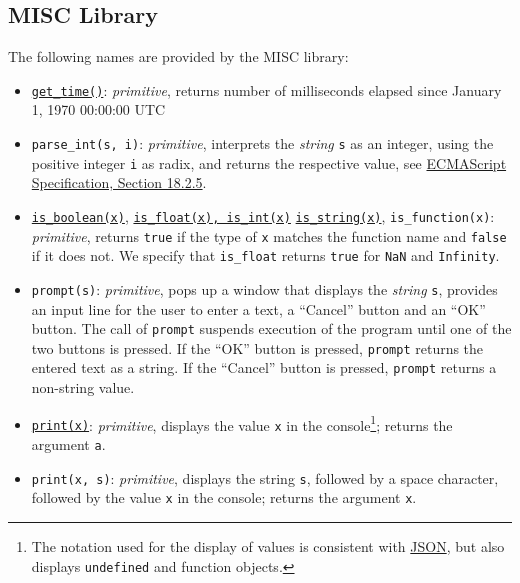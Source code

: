 \subsection*{MISC Library}


The following
names are provided by the MISC library:
\begin{itemize}
\item \href{https://sourceacademy.org/sicpjs/1.2.6\#ex_1.22}{\lstinline{get_time()}}: \textit{primitive}, returns number of milliseconds elapsed since January 1, 1970 00:00:00 UTC
\item \verb#parse_int#\texttt{(s, i)}: \textit{primitive}, 
interprets the \emph{string} \texttt{s} as an integer, using the positive integer \texttt{i} as radix, and returns the respective value,
see \href{https://www.ecma-international.org/ecma-262/9.0/index.html\#sec-parseint-string-radix}{\color{DarkBlue}ECMAScript Specification, Section 18.2.5}.
\item \href{https://sourceacademy.org/sicpjs/4.1.2\#p2}{\lstinline{is_boolean(x)}}, \href{https://sourceacademy.org/sicpjs/2.3.2\#p5}{\lstinline{is_float(x), is_int(x)}}
  \href{https://sourceacademy.org/sicpjs/2.3.2\#p7}{\lstinline{is_string(x)}}, \verb#is_function#\texttt{(x)}: \textit{primitive}, returns \texttt{true} if the type of \texttt{x} matches the function name and \texttt{false} if it does not. We specify that \verb#is_float# returns \texttt{true} for \texttt{NaN} and \texttt{Infinity}.
\item \texttt{prompt(s)}: \textit{primitive}, pops up a window that displays the \emph{string} \texttt{s}, provides
an input line for the user to enter a text, a ``Cancel'' button and an ``OK'' button. The call of \texttt{prompt}
suspends execution of the program until one of the two buttons is pressed. If 
the ``OK'' button is pressed, \texttt{prompt} returns the entered text as a string.
If the ``Cancel'' button is pressed, \texttt{prompt} returns a non-string value.
\item \href{https://sourceacademy.org/sicpjs/1.2.6\#footnote-7}{\texttt{print(x)}}: \textit{primitive}, displays the value \texttt{x} in the console\footnote{The notation used for the display of values is consistent with \href{http://www.ecma-international.org/publications/files/ECMA-ST/ECMA-404.pdf}{\color{DarkBlue}JSON}, but also displays \texttt{undefined} and function objects.}; returns the argument \texttt{a}.
\item \texttt{print(x, s)}: \textit{primitive}, displays the string \texttt{s}, followed by a space character, followed by the value \texttt{x} in the console\footnotemark[\value{footnote}]; returns the argument \texttt{x}.

\end{itemize}
